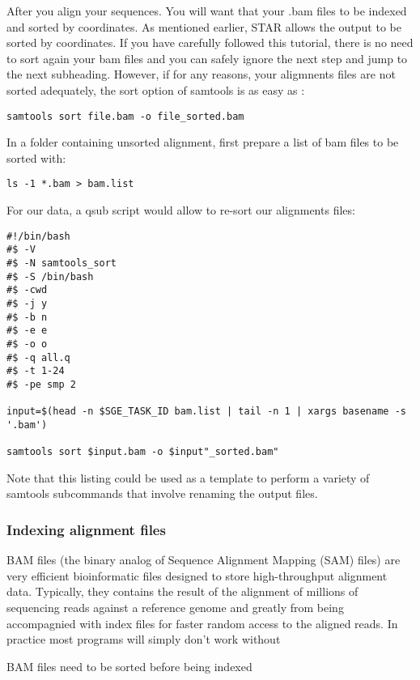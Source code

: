 After you align your sequences. You will want that your .bam files to be indexed and sorted by coordinates. As mentioned earlier, STAR allows the output to be sorted by coordinates. If you have carefully followed this tutorial, there is no need to sort again your bam files and you can safely ignore the next step and jump to the next subheading. However, if for any reasons, your aligmnents files are not sorted adequately, the sort option of samtools is as easy as :

\begin{verbatim}
samtools sort file.bam -o file_sorted.bam
\end{verbatim}

In a folder containing unsorted alignment, first prepare a list of bam files to be sorted with:

\begin{verbatim}
ls -1 *.bam > bam.list
\end{verbatim}

For our data, a qsub script would allow to re-sort our alignments files:


\begin{verbatim}
#!/bin/bash
#$ -V
#$ -N samtools_sort
#$ -S /bin/bash
#$ -cwd
#$ -j y
#$ -b n
#$ -e e
#$ -o o
#$ -q all.q
#$ -t 1-24
#$ -pe smp 2

input=$(head -n $SGE_TASK_ID bam.list | tail -n 1 | xargs basename -s '.bam')

samtools sort $input.bam -o $input"_sorted.bam"

\end{verbatim}

Note that this listing could be used as a template to perform a variety of samtools subcommands that involve renaming the output files.


\subsubsection{Indexing alignment files}

BAM files (the binary analog of Sequence Alignment Mapping (SAM) files) are very efficient bioinformatic files designed to store high-throughput alignment data. Typically, they contains the result of the alignment of millions of sequencing reads against a reference genome and greatly from being accompagnied with index files for faster random access to the aligned reads. In practice most programs will simply don't work without  

 
BAM files need to be sorted before being indexed

